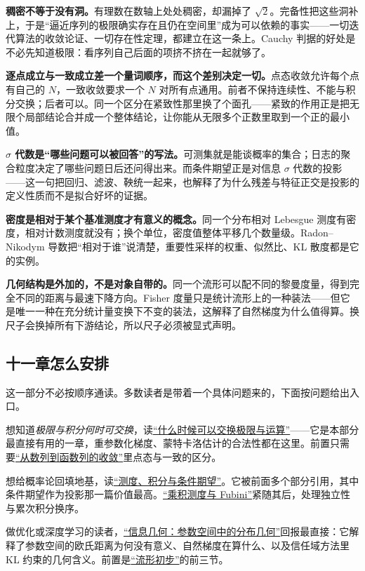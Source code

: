 \textbf{稠密不等于没有洞。}有理数在数轴上处处稠密，却漏掉了 \(\sqrt2\)。完备性把这些洞补上，于是``逼近序列的极限确实存在且仍在空间里''成为可以依赖的事实——一切迭代算法的收敛论证、一切存在性定理，都建立在这一条上。Cauchy 判据的好处是不必先知道极限：看序列自己后面的项挤不挤在一起就够了。

\textbf{逐点成立与一致成立差一个量词顺序，而这个差别决定一切。}点态收敛允许每个点有自己的 \(N\)，一致收敛要求一个 \(N\) 对所有点通用。前者不保持连续性、不能与积分交换；后者可以。同一个区分在紧致性那里换了个面孔——紧致的作用正是把无限个局部结论合并成一个整体结论，让你能从无限多个正数里取到一个正的最小值。

\textbf{\(\sigma\) 代数是``哪些问题可以被回答''的写法。}可测集就是能谈概率的集合；日志的聚合粒度决定了哪些问题日后还问得出来。而条件期望正是对信息 \(\sigma\) 代数的投影——这一句把回归、滤波、鞅统一起来，也解释了为什么残差与特征正交是投影的定义性质而不是拟合好坏的证据。

\textbf{密度是相对于某个基准测度才有意义的概念。}同一个分布相对 Lebesgue 测度有密度，相对计数测度就没有；换个单位，密度值整体平移几个数量级。Radon–Nikodym 导数把``相对于谁''说清楚，重要性采样的权重、似然比、KL 散度都是它的实例。

\textbf{几何结构是外加的，不是对象自带的。}同一个流形可以配不同的黎曼度量，得到完全不同的距离与最速下降方向。Fisher 度量只是统计流形上的一种装法——但它是唯一一种在充分统计量变换下不变的装法，这解释了自然梯度为什么值得算。换尺子会换掉所有下游结论，所以尺子必须被显式声明。

\subsection{十一章怎么安排}

这一部分不必按顺序通读。多数读者是带着一个具体问题来的，下面按问题给出入口。

想知道\emph{极限与积分何时可交换}，读\hyperref[ch:100]{``什么时候可以交换极限与运算''}——它是本部分最直接有用的一章，重参数化梯度、蒙特卡洛估计的合法性都在这里。前置只需要\hyperref[ch:098]{``从数列到函数列的收敛''}里点态与一致的区分。

想给概率论回填地基，读\hyperref[ch:101]{``测度、积分与条件期望''}。它被前面多个部分引用，其中条件期望作为投影那一篇价值最高。\hyperref[ch:102]{``乘积测度与 Fubini''}紧随其后，处理独立性与累次积分换序。

做优化或深度学习的读者，\hyperref[ch:105]{``信息几何：参数空间中的分布几何''}回报最直接：它解释了参数空间的欧氏距离为何没有意义、自然梯度在算什么、以及信任域方法里 KL 约束的几何含义。前置是\hyperref[ch:104]{``流形初步''}的前三节。

